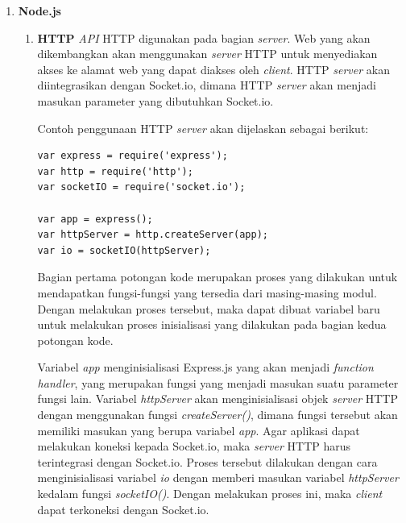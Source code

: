 \begin{enumerate}
	\item \textbf{Node.js} \\
	\begin{enumerate}
		\item \textbf{HTTP}
		\textit{API} HTTP digunakan pada bagian \textit{server}. Web yang akan dikembangkan akan menggunakan \textit{server} HTTP untuk menyediakan akses ke alamat web yang dapat diakses oleh \textit{client}. HTTP \textit{server} akan diintegrasikan dengan Socket.io, dimana HTTP \textit{server} akan menjadi masukan parameter yang dibutuhkan Socket.io.
		
		Contoh penggunaan HTTP \textit{server} akan dijelaskan sebagai berikut:
\begin{lstlisting}[caption={Contoh penggunaan \textit{interface} \textit{HTTP}}, label={lst:nodeHTTP}, captionpos=b]
var express = require('express');
var http = require('http');
var socketIO = require('socket.io');

var app = express();
var httpServer = http.createServer(app);
var io = socketIO(httpServer);
\end{lstlisting}

Bagian pertama potongan kode merupakan proses yang dilakukan untuk mendapatkan fungsi-fungsi yang tersedia dari masing-masing modul. Dengan melakukan proses tersebut, maka dapat dibuat variabel baru untuk melakukan proses inisialisasi yang dilakukan pada bagian kedua potongan kode.

Variabel \textit{app} menginisialisasi Express.js yang akan menjadi \textit{function handler}, yang merupakan fungsi yang menjadi masukan suatu parameter fungsi lain. Variabel \textit{httpServer} akan menginisialisasi objek \textit{server} HTTP dengan menggunakan fungsi \textit{createServer()}, dimana fungsi tersebut akan memiliki masukan yang berupa variabel \textit{app}. Agar aplikasi dapat melakukan koneksi kepada Socket.io, maka \textit{server} HTTP harus terintegrasi dengan Socket.io. Proses tersebut dilakukan dengan cara menginisialisasi variabel \textit{io} dengan memberi masukan variabel \textit{httpServer} kedalam fungsi \textit{socketIO()}. Dengan melakukan proses ini, maka \textit{client} dapat terkoneksi dengan Socket.io.

		

\end{enumerate}
\end{enumerate}
